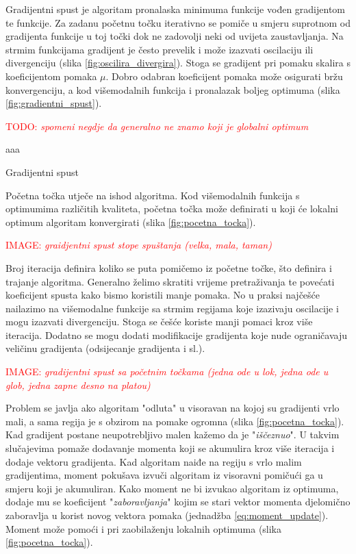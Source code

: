 \documentclass[times, utf8, diplomski]{fer}
\def\TODO#1{\noindent\textcolor{red}{TODO: \textit{#1}}\newline}
\def\todo#1{\TODO{#1}}
\def\todoimg#1{\begin{center} \textcolor{red}{IMAGE: \textit{#1}} \end{center}}
\begin{document}
Gradijentni spust je algoritam pronalaska minimuma funkcije vođen gradijentom te funkcije. Za zadanu početnu točku iterativno se pomiče u smjeru suprotnom od gradijenta funkcije u toj točki dok ne zadovolji neki od uvijeta zaustavljanja. Na strmim funkcijama gradijent je često prevelik i može izazvati oscilaciju ili divergenciju (slika \ref{fig:oscilira_divergira}). Stoga se gradijent pri pomaku skalira s koeficijentom pomaka $\mu$. Dobro odabran koeficijent pomaka može osigurati bržu konvergenciju, a kod višemodalnih funkcija i pronalazak boljeg optimuma (slika \ref{fig:gradientni_spust}).

\todo{spomeni negdje da generalno ne znamo koji je globalni optimum}

\begin{algorithm}[H]
aaa
\EndFor
\caption{Gradijentni spust}
\label{alg:grad_spust}
\end{algorithm}


Početna točka utječe na ishod algoritma. Kod višemodalnih funkcija s optimumima različitih kvaliteta, početna točka može definirati u koji će lokalni optimum algoritam konvergirati (slika \ref{fig:pocetna_tocka}). 

\todoimg{graidjentni spust stope spuštanja (velka, mala, taman)}
\label{fig:oscilira_divergira}

Broj iteracija definira koliko se puta pomičemo iz početne točke, što definira i trajanje algoritma. Generalno želimo skratiti vrijeme pretraživanja te povećati koeficijent spusta kako bismo koristili manje pomaka. No u praksi najčešće nailazimo na višemodalne funkcije sa strmim regijama koje izazivaju oscilacije i mogu izazvati divergenciju. Stoga se češće koriste manji pomaci kroz više iteracija. Dodatno se mogu dodati modifikacije gradijenta koje nude ograničavaju veličinu gradijenta (odsijecanje gradijenta i sl.).

\todoimg{gradijentni spust sa početnim točkama (jedna ode u lok, jedna ode u glob, jedna zapne desno na platou)}
\label{fig:pocetna_tocka}

Problem se javlja ako algoritam "odluta" u visoravan na kojoj su gradijenti vrlo mali, a sama regija je s obzirom na pomake ogromna (slika \ref{fig:pocetna_tocka}). Kad gradijent postane neupotrebljivo malen kažemo da je "\textit{iščeznuo}". U takvim slučajevima pomaže dodavanje momenta koji se akumulira kroz više iteracija i dodaje vektoru gradijenta. Kad algoritam naiđe na regiju s vrlo malim gradijentima, moment pokušava izvuči algoritam iz visoravni pomičući ga u smjeru koji je akumuliran. Kako moment ne bi izvukao algoritam iz optimuma, dodaje mu se koeficijent "\textit{zaboravljanja}" kojim se stari vektor momenta djelomično zaboravlja u korist novog vektora pomaka (jednadžba \ref{eq:moment_update}). Moment može pomoći i pri zaobilaženju lokalnih optimuma (slika \ref{fig:pocetna_tocka}).
\end{document}
